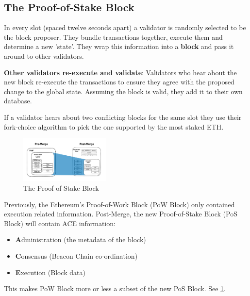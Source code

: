 \subsection{The Proof-of-Stake Block}
In every slot (spaced twelve seconds apart) a validator is randomly selected to be the block proposer. They bundle transactions together, execute them and determine a new 'state'. They wrap this information into a \textbf{block} and pass it around to other validators.

\textbf{Other validators re-execute and validate}: Validators who hear about the new block re-execute the transactions to ensure they agree with the proposed change to the global state. Assuming the block is valid, they add it to their own database.

If a validator hears about two conflicting blocks for the same slot they use their fork-choice algorithm to pick the one supported by the most staked ETH.

\begin{figure}
    \centering
    \includegraphics[width=0.40\textwidth]{ethereum/assets/block-merge.png}
    \caption{The Proof-of-Stake Block}
    \label{fig:pos-block}
\end{figure}

Previously, the Ethereum's Proof-of-Work Block (PoW Block) only contained execution related information. Post-Merge, the new Proof-of-Stake Block (PoS Block) will contain ACE information: 
\begin{itemize}
    \item \textbf{A}dministration (the metadata of the block)
    \item \textbf{C}onsensus (Beacon Chain co-ordination)
    \item \textbf{E}xecution (Block data)
\end{itemize}
This makes PoW Block more or less a subset of the new PoS Block. See \ref{fig:pos-block}.

